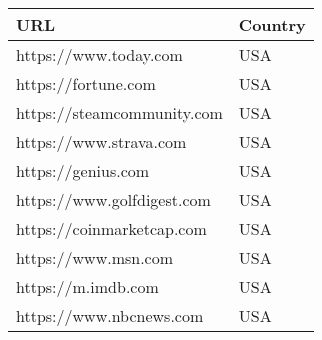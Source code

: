 \begin{center}
\begin{tabular}{ll}
	\toprule
	URL   & Country        \\
	\midrule
    https://www.today.com & USA \\
    https://fortune.com & USA \\
    https://steamcommunity.com & USA \\
    https://www.strava.com & USA \\
    https://genius.com & USA \\
    https://www.golfdigest.com & USA \\
    https://coinmarketcap.com & USA \\
    https://www.msn.com & USA \\
    https://m.imdb.com & USA \\
    https://www.nbcnews.com & USA \\
	\bottomrule
\end{tabular}
\end{center}
